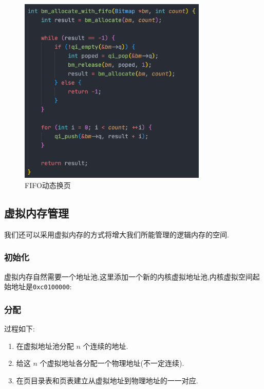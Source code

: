 \begin{figure}[H]
    \centering
    \includegraphics[width=0.8\textwidth]{figures/fifo.png}
    \caption{FIFO动态换页}
    \label{fig:my_label}
\end{figure}

\subsection{虚拟内存管理}

我们还可以采用虚拟内存的方式将增大我们所能管理的逻辑内存的空间.

\subsubsection{初始化}

虚拟内存自然需要一个地址池,这里添加一个新的内核虚拟地址池,内核虚拟空间起始地址是\texttt{0xc0100000}:

\subsubsection{分配}
过程如下:

\begin{enumerate}[itemindent=1em]
    \item 在虚拟地址池分配 $n$ 个连续的地址.
    \item 给这 $n$ 个虚拟地址各分配一个物理地址(不一定连续).
    \item 在页目录表和页表建立从虚拟地址到物理地址的一一对应.
\end{enumerate}

